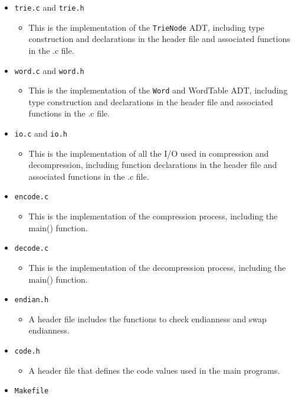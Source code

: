 \documentclass[12pt]{article}
\begin{document}
\begin{itemize}
   \item \texttt{trie.c} and \texttt{trie.h}
   \begin{itemize}
     \item This is the implementation of the \texttt{TrieNode} ADT, including type construction and declarations in the header file and associated functions in the .c file.
   \end{itemize}
   \item \texttt{word.c} and \texttt{word.h}
   \begin{itemize}
     \item This is the implementation of the \texttt{Word} and WordTable ADT, including type construction and declarations in the header file and associated functions in the .c file.
   \end{itemize}
   \item \texttt{io.c} and \texttt{io.h}
   \begin{itemize}
     \item This is the implementation of all the I/O used in compression and decompression, including function declarations in the header file and associated functions in the .c file.
   \end{itemize}
   \item \texttt{encode.c}
   \begin{itemize}
     \item This is the implementation of the compression process, including the main() function.
   \end{itemize}
   \item \texttt{decode.c}
   \begin{itemize}
     \item This is the implementation of the decompression process, including the main() function.
   \end{itemize}
   \item \texttt{endian.h}
   \begin{itemize}
     \item A header file includes the functions to check endianness and swap endianness.
   \end{itemize}
   \item \texttt{code.h}
   \begin{itemize}
     \item A header file that defines the code values used in the main programs.
   \end{itemize}
   \item \texttt{Makefile}

\end{itemize}
\end{document}
